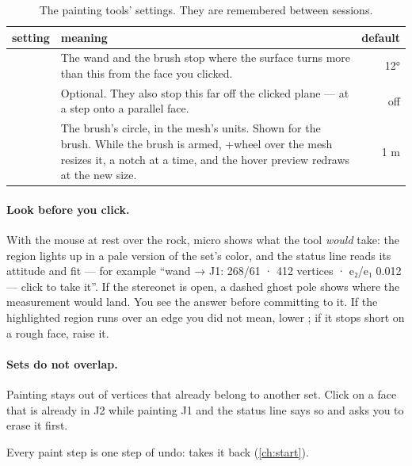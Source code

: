 \begin{table}[htbp]\small
\begin{tabularx}{\linewidth}{@{}lMD@{}}\toprule
setting & meaning & default \\ \midrule
{} & The wand and the brush stop where the surface turns more than this from the face you clicked. & 12° \\
 & Optional. They also stop this far off the clicked plane — at a step onto a parallel face. & off \\
 & The brush's circle, in the mesh's units. Shown for the brush. While the brush is armed, +wheel over the mesh resizes it, a notch at a time, and the hover preview redraws at the new size. & 1 m \\ \bottomrule
\end{tabularx}
\caption{The painting tools' settings. They are remembered between sessions.}\label{tab:structure-tools}
\end{table}

\paragraph{Look before you click.} With the mouse at rest over the rock, micro shows what the tool \emph{would} take: the region lights up in a pale version of the set's color, and the status line reads its attitude and fit — for example “wand → J1: 268/61 · 412 vertices · e₂/e₁ 0.012 — click to take it”. If the stereonet is open, a dashed ghost pole shows where the measurement would land. You see the answer before committing to it. If the highlighted region runs over an edge you did not mean, lower ; if it stops short on a rough face, raise it.

\paragraph{Sets do not overlap.} Painting stays out of vertices that already belong to another set. Click on a face that is already in J2 while painting J1 and the status line says so and asks you to erase it first.

Every paint step is one step of undo:  takes it back (\cref{ch:start}).


